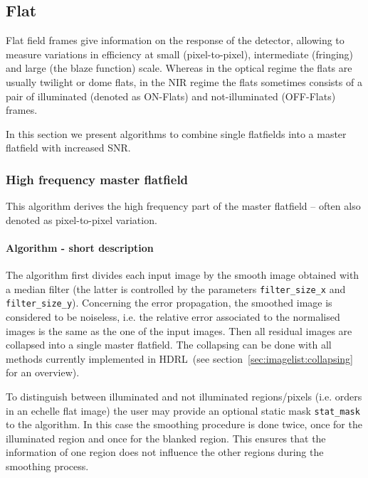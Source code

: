 
\subsection{Flat}
\label{flat:main}

Flat field frames give information on the response of the detector,
allowing to measure variations in efficiency at small
(pixel-to-pixel), intermediate (fringing) and large (the blaze
function) scale.  Whereas in the optical regime the flats are usually
twilight or dome flats, in the NIR regime the flats sometimes consists
of a pair of illuminated (denoted as ON-Flats) and not-illuminated
(OFF-Flats) frames.

In this section we present algorithms to combine single flatfields into
a master flatfield with increased SNR.


\subsubsection{High frequency master flatfield}
\label{flat:algorithms:hf}

This algorithm derives the high frequency part of the master flatfield
-- often also denoted as pixel-to-pixel variation.
\paragraph{Algorithm - short description}
\label{flat:algorithms:hf:short}

The algorithm first divides each input image by the smooth image
obtained with a median filter (the latter is controlled by the
parameters \verb,filter_size_x, and \verb,filter_size_y,). Concerning
the error propagation, the smoothed image is considered to be
noiseless, i.e. the relative error associated to the normalised images
is the same as the one of the input images. Then all residual images
are collapsed into a single master flatfield. The collapsing can be
done with all methods currently implemented in HDRL~(see
section~\ref{sec:imagelist:collapsing} for an overview).

To distinguish between illuminated and not illuminated regions/pixels
(i.e. orders in an echelle flat image) the user may provide an
optional static mask \verb,stat_mask, to the algorithm. In this case
the smoothing procedure is done twice, once for the illuminated region
and once for the blanked region. This ensures that the information of
one region does not influence the other regions during the smoothing
process.

